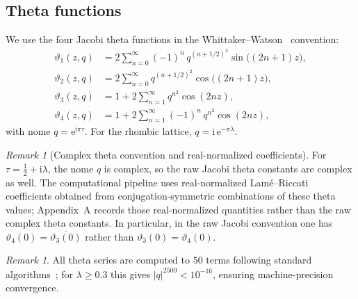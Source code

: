 \documentclass[11pt,a4paper]{article}
\theoremstyle{plain}
\theoremstyle{definition}
\theoremstyle{remark}
\newtheorem{remark}[theorem]{Remark}
\newcommand{\vt}[1]{\vartheta_{#1}}     %
\newcommand{\ee}{\mathrm{e}}
\newcommand{\ii}{\mathrm{i}}
\newcommand{\abs}[1]{\lvert #1 \rvert}
\begin{document}
\subsection{Theta functions}\label{sec:theta}
We use the four Jacobi theta functions in the
Whittaker--Watson~\cite{WW27} convention:
\begin{align}
  \vt{1}(z,q) &= 2\sum_{n=0}^{\infty} (-1)^n\, q^{(n+1/2)^2}
    \sin\bigl((2n+1)z\bigr), \label{eq:theta1} \\
  \vt{2}(z,q) &= 2\sum_{n=0}^{\infty} q^{(n+1/2)^2}
    \cos\bigl((2n+1)z\bigr), \label{eq:theta2} \\
  \vt{3}(z,q) &= 1 + 2\sum_{n=1}^{\infty} q^{n^2}
    \cos(2nz), \label{eq:theta3} \\
  \vt{4}(z,q) &= 1 + 2\sum_{n=1}^{\infty} (-1)^n\, q^{n^2}
    \cos(2nz), \label{eq:theta4}
\end{align}
with nome $q = \ee^{\ii\pi\tau}$.  For the rhombic lattice,
$q = \ii\,\ee^{-\pi\lambda}$.

\begin{remark}[Complex theta convention and real-normalized coefficients]
  For $\tau = \tfrac12 + \ii\lambda$, the nome $q$ is complex, so the
  raw Jacobi theta constants are complex as well.  The computational
  pipeline uses real-normalized Lam\'e--Riccati coefficients obtained from
  conjugation-symmetric combinations of these theta values; Appendix~A
  records those real-normalized quantities rather than the raw complex
  theta constants.  In particular, in the raw Jacobi convention one has
  $\vt{4}(0) = \overline{\vt{3}(0)}$ rather than
  $\vt{3}(0) = \vt{4}(0)$.
\end{remark}

\begin{remark}
  All theta series are computed to $50$ terms following
  standard algorithms~\cite{Dee11}; for
  $\lambda \geq 0.3$ this gives $\abs{q}^{2500} < 10^{-16}$, ensuring
  machine-precision convergence.
\end{remark}
\end{document}

